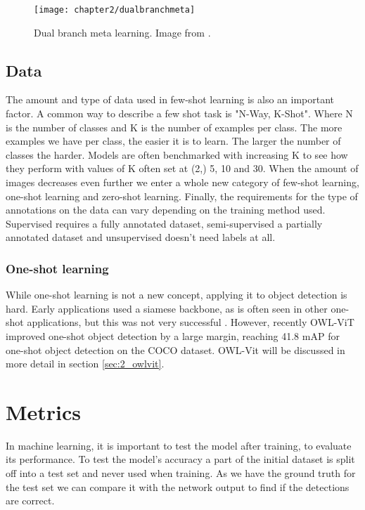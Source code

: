 \begin{figure}[H]
	\centering
	\texttt{[image: chapter2/dualbranchmeta]}
	\caption{\label{fig:2_dualbranchmeta} Dual branch meta learning. Image from \citet{few-shot-comprehensive-survey}.}
\end{figure}

\subsection{Data}

The amount and type of data used in few-shot learning is also an important factor. A common way to describe a few shot task is "N-Way, K-Shot". Where N is the number of classes and K is the number of examples per class. The more examples we have per class, the easier it is to learn. The larger the number of classes the harder. Models are often benchmarked with increasing K to see how they perform with values of K often set at (2,) 5, 10 and 30. When the amount of images decreases even further we enter a whole new category of few-shot learning, one-shot learning and zero-shot learning. Finally, the requirements for the type of annotations on the data can vary depending on the training method used. Supervised requires a fully annotated dataset, semi-supervised a partially annotated dataset and unsupervised doesn't need labels at all.

\subsubsection*{One-shot learning}

While one-shot learning is not a new concept, applying it to object detection is hard. Early applications used a siamese backbone, as is often seen in other one-shot applications, but this was not very successful \citep{One-shot-siamese}. However, recently OWL-ViT \citep{owlvit} improved one-shot object detection by a large margin, reaching 41.8 mAP for one-shot object detection on the COCO dataset. OWL-Vit will be discussed in more detail in section \ref{sec:2_owlvit}.


\section{Metrics}\label{sec:2_metrics}
In machine learning, it is important to test the model after training, to evaluate its performance. To test the model's accuracy a part of the initial dataset is split off into a test set and never used when training. As we have the ground truth for the test set we can compare it with the network output to find if the detections are correct. 


